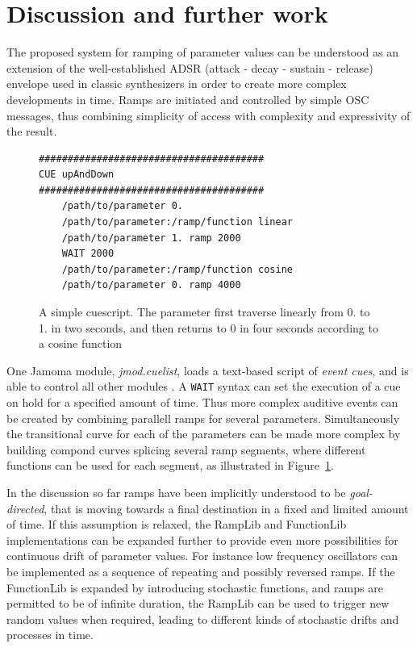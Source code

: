 \documentclass{article}
\begin{document}


\section{Discussion and further work} %
\label{sec:discussion_and_further_work}

The proposed system for ramping of parameter values can be understood as an extension of the well-established ADSR (attack - decay - sustain - release) envelope used in classic synthesizers in order to create more complex developments in time. Ramps are initiated and controlled by simple OSC messages, thus combining simplicity of access with complexity and expressivity of the result.

\begin{figure}
\begin{small}
\begin{verbatim}
#######################################
CUE upAndDown
#######################################
	/path/to/parameter 0.
	/path/to/parameter:/ramp/function linear
	/path/to/parameter 1. ramp 2000
	WAIT 2000
	/path/to/parameter:/ramp/function cosine
	/path/to/parameter 0. ramp 4000
\end{verbatim}
\end{small}
\caption{A simple cuescript. The parameter first traverse linearly from 0. to 1. in two seconds, and then returns to 0 in four seconds according to a cosine function}
\label{fig:cuescript}
\end{figure}

One Jamoma module, \emph{jmod.cuelist}, loads a text-based script of \emph{event cues}, and is able to control all other modules \cite{Place:2006}. A \texttt{WAIT} syntax can set the execution of a cue on hold for a specified amount of time. Thus more complex auditive events can be created by combining parallell ramps for several parameters. Simultaneously the transitional curve for each of the parameters can be made more complex by building compond curves splicing several ramp segments, where different functions can be used for each segment, as illustrated in Figure~\ref{fig:cuescript}.

In the discussion so far ramps have been implicitly understood to be \emph{goal-directed}, that is moving towards a final destination in a fixed and limited amount of time. If this assumption is relaxed, the RampLib and FunctionLib implementations can be expanded further to provide even more possibilities for continuous drift of parameter values. For instance low frequency oscillators can be implemented as a sequence of repeating and possibly reversed ramps. If the FunctionLib is expanded by introducing stochastic functions, and ramps are permitted to be of infinite duration, the RampLib can be used to trigger new random values when required, leading to different kinds of stochastic drifts and processes in time.
\end{document}
